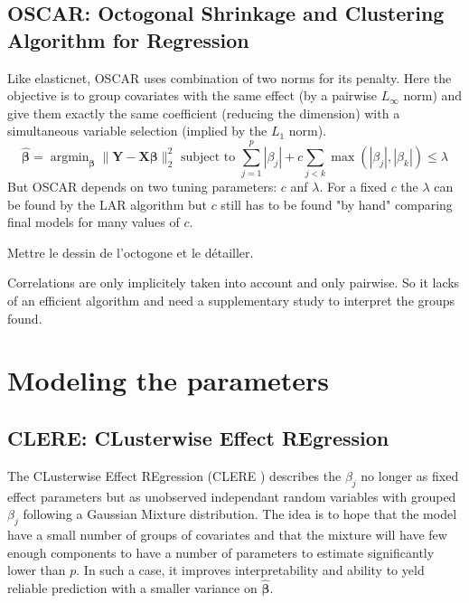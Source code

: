 \documentclass[12pt,a4paper]{report}
\begin{document}
		\subsection{OSCAR: Octogonal Shrinkage and Clustering Algorithm for Regression }		%

			Like elasticnet, \textsc{OSCAR} \cite{bondell2008simultaneous} uses combination of two norms for its penalty. Here the objective is to group covariates with the same effect (by a pairwise $L_\infty$ norm) and give them exactly the same coefficient (reducing the dimension) with a simultaneous variable selection (implied by the $L_1$ norm).
			\begin{equation}
				\hat{\boldsymbol{\beta}}=\operatorname{argmin}_{\boldsymbol{\beta}} \parallel\boldsymbol{Y}-\boldsymbol{X}\boldsymbol{\beta} \parallel^2_2 \textrm{ subject to } \sum_{j=1}^p|\beta_j|+c\sum_{j<k}\operatorname{max}(|\beta_j|,|\beta_k|) \leq \lambda		
			\end{equation}						
			But \textsc{OSCAR} depends on two tuning parameters: $c$ anf $\lambda$. For a fixed $c$ the $\lambda$ can be found by the \textsc{LAR} algorithm but $c$ still has to be found "by hand" comparing final models for many values of $c$.
			
Mettre le dessin de l'octogone et le détailler.			
			
			
			Correlations are only implicitely taken into account and only pairwise. So it lacks of an efficient algorithm and need a supplementary study to interpret the groups found.
		
		
	\section{Modeling the parameters}			%

		\subsection{CLERE: CLusterwise Effect REgression}		%

			The CLusterwise Effect REgression (\textsc{CLERE} \cite{yengo2012variable}) describes the $\beta_j$ no longer as fixed effect parameters but as unobserved independant random variables with grouped $\beta_j$ following a Gaussian Mixture distribution. The idea is to hope that the model have a small number of groups of covariates and that the mixture will have few enough components to have a number of parameters to estimate significantly lower than $p$. In such a case, it improves interpretability and ability to yeld reliable prediction with a smaller variance on $\boldsymbol{\hat{\beta}}$. 
	
\end{document}
